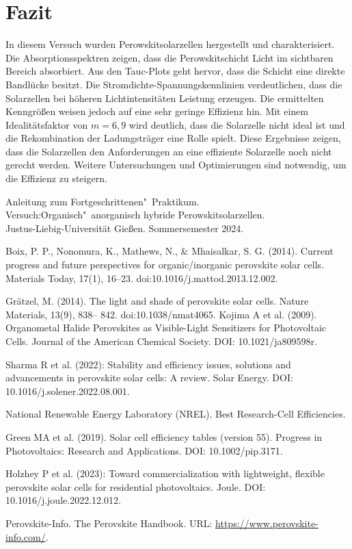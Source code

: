 \documentclass[12pt,a4paper,ngerman]{report}
\begin{document}
\chapter{Fazit}
In diesem Versuch wurden Perowskitsolarzellen hergestellt und charakterisiert. Die Absorptionsspektren zeigen, dass die Perowskitschicht Licht im sichtbaren Bereich absorbiert. Aus den Tauc-Plots geht hervor, dass die Schicht eine direkte Bandlücke besitzt. Die Stromdichte-Spannungskennlinien verdeutlichen, dass die Solarzellen bei höheren Lichtintensitäten Leistung erzeugen. Die ermittelten Kenngrößen weisen jedoch auf eine sehr geringe Effizienz hin. Mit einem Idealitätsfaktor von $m=6,9$ wird deutlich, dass die Solarzelle nicht ideal ist und die Rekombination der Ladungsträger eine Rolle spielt. Diese Ergebnisse zeigen, dass die Solarzellen den Anforderungen an eine effiziente Solarzelle noch nicht gerecht werden. Weitere Untersuchungen und Optimierungen sind notwendig, um die Effizienz zu steigern.



\listoffigures%
	
\begin{thebibliography}{111}%
	Anleitung zum Fortgeschrittenen"~Praktikum.\\ \glqq Versuch:\.Organisch"~anorganisch hybride Perowskitsolarzellen\grqq.\\ Justus-Liebig-Universität Gießen. Sommersemester 2024.
	
	Boix, P. P., Nonomura, K., Mathews, N., \& Mhaisalkar, S. G. (2014). Current progress and future perspectives for organic/inorganic perovskite solar cells. Materials Today, 17(1), 16–23. doi:10.1016/j.mattod.2013.12.002.

	Grätzel, M. (2014). The light and shade of perovskite solar cells. Nature Materials, 13(9), 838– 842. doi:10.1038/nmat4065.
	Kojima A et al. (2009). Organometal Halide Perovskites as Visible-Light Sensitizers for Photovoltaic Cells.
	Journal of the American Chemical Society. DOI: 10.1021/ja809598r.
	
	Sharma R et al. (2022): Stability and efficiency issues, solutions and advancements in perovskite solar cells: A review. Solar Energy. DOI: 10.1016/j.solener.2022.08.001.

	National Renewable Energy Laboratory (NREL). Best Research-Cell Efficiencies.

	Green MA et al. (2019). Solar cell efficiency tables (version 55). Progress in Photovoltaics: Research and Applications. DOI: 10.1002/pip.3171.

	Holzhey P et al. (2023): Toward commercialization with lightweight, flexible perovskite solar cells for residential photovoltaics. Joule. DOI: 10.1016/j.joule.2022.12.012.

	Perovskite-Info. The Perovskite Handbook. URL: \url{https://www.perovskite-info.com/}.
	
	\end{thebibliography}
\end{document}

